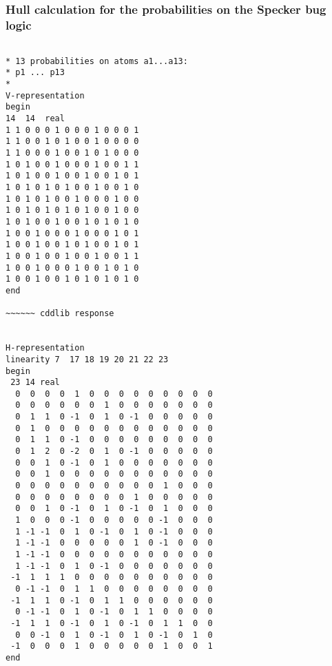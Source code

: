 \documentclass[%
  twocolumn,
 showpacs,
 showkeys,
 preprintnumbers,
 amsmath,amssymb,
 aps,
  pra,
  longbibliography,
 floatfix,
 ]{revtex4-1}
\begin{document}
\subsubsection{Hull calculation for the probabilities on the Specker bug logic}

{ \begin{lstlisting}[backgroundcolor=\color{yellow!10},framerule=0pt,breaklines=true, frame=tb]

* 13 probabilities on atoms a1...a13:
* p1 ... p13
*
V-representation
begin
14  14  real
1 1 0 0 0 1 0 0 0 1 0 0 0 1
1 1 0 0 1 0 1 0 0 1 0 0 0 0
1 1 0 0 0 1 0 0 1 0 1 0 0 0
1 0 1 0 0 1 0 0 0 1 0 0 1 1
1 0 1 0 0 1 0 0 1 0 0 1 0 1
1 0 1 0 1 0 1 0 0 1 0 0 1 0
1 0 1 0 1 0 0 1 0 0 0 1 0 0
1 0 1 0 1 0 1 0 1 0 0 1 0 0
1 0 1 0 0 1 0 0 1 0 1 0 1 0
1 0 0 1 0 0 0 1 0 0 0 1 0 1
1 0 0 1 0 0 1 0 1 0 0 1 0 1
1 0 0 1 0 0 1 0 0 1 0 0 1 1
1 0 0 1 0 0 0 1 0 0 1 0 1 0
1 0 0 1 0 0 1 0 1 0 1 0 1 0
end

~~~~~~ cddlib response


H-representation
linearity 7  17 18 19 20 21 22 23
begin
 23 14 real
  0  0  0  0  1  0  0  0  0  0  0  0  0  0
  0  0  0  0  0  0  1  0  0  0  0  0  0  0
  0  1  1  0 -1  0  1  0 -1  0  0  0  0  0
  0  1  0  0  0  0  0  0  0  0  0  0  0  0
  0  1  1  0 -1  0  0  0  0  0  0  0  0  0
  0  1  2  0 -2  0  1  0 -1  0  0  0  0  0
  0  0  1  0 -1  0  1  0  0  0  0  0  0  0
  0  0  1  0  0  0  0  0  0  0  0  0  0  0
  0  0  0  0  0  0  0  0  0  0  1  0  0  0
  0  0  0  0  0  0  0  0  1  0  0  0  0  0
  0  0  1  0 -1  0  1  0 -1  0  1  0  0  0
  1  0  0  0 -1  0  0  0  0  0 -1  0  0  0
  1 -1 -1  0  1  0 -1  0  1  0 -1  0  0  0
  1 -1 -1  0  0  0  0  0  1  0 -1  0  0  0
  1 -1 -1  0  0  0  0  0  0  0  0  0  0  0
  1 -1 -1  0  1  0 -1  0  0  0  0  0  0  0
 -1  1  1  1  0  0  0  0  0  0  0  0  0  0
  0 -1 -1  0  1  1  0  0  0  0  0  0  0  0
 -1  1  1  0 -1  0  1  1  0  0  0  0  0  0
  0 -1 -1  0  1  0 -1  0  1  1  0  0  0  0
 -1  1  1  0 -1  0  1  0 -1  0  1  1  0  0
  0  0 -1  0  1  0 -1  0  1  0 -1  0  1  0
 -1  0  0  0  1  0  0  0  0  0  1  0  0  1
end

\end{lstlisting}  }
\end{document}
